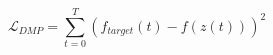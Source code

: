 \begin{equation}
    \mathcal{L}_{DMP} = \sum_{t=0}^{T}(f_{target}(t) - f(z(t)))^{2}
    \label{eq:dmp_loss}
\end{equation}
